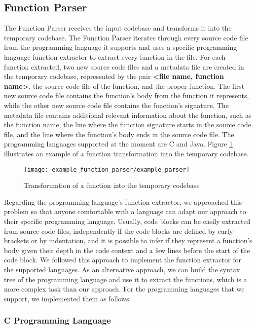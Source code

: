 \subsection{Function Parser}

The Function Parser receives the input codebase and transforms it into the temporary codebase. The Function Parser iterates through every source code file from the programming language it supports and uses a specific programming language function extractor to extract every function in the file. For each function extracted, two new source code files and a metadata file are created in the temporary codebase, represented by the pair \textbf{<file name, function name>}, the source code file of the function, and the proper function. The first new source code file contains the function's body from the function it represents, while the other new source code file contains the function's signature. The metadata file contains additional relevant information about the function, such as the function name, the line where the function signature starts in the source code file, and the line where the function's body ends in the source code file. The programming languages supported at the moment are C and Java. Figure \ref{fig:transform} illustrates an example of a function transformation into the temporary codebase.

\begin{figure}
\texttt{[image: example\_function\_parser/example\_parser]}
\caption{Transformation of a function into the temporary codebase}
\label{fig:transform}
\end{figure}

Regarding the programming language's function extractor, we approached this problem so that anyone comfortable with a language can adapt our approach to their specific programming language. Usually, code blocks can be easily extracted from source code files, independently if the code blocks are defined by curly brackets or by indentation, and it is possible to infer if they represent a function's body given their depth in the code context and a few lines before the start of the code block. We followed this approach to implement the function extractor for the supported languages. As an alternative approach, we can build the syntax tree \citep{compiler} of the programming language and use it to extract the functions, which is a more complex task than our approach. For the programming languages that we support, we implemented them as follows:

\subsubsection{C Programming Language}

